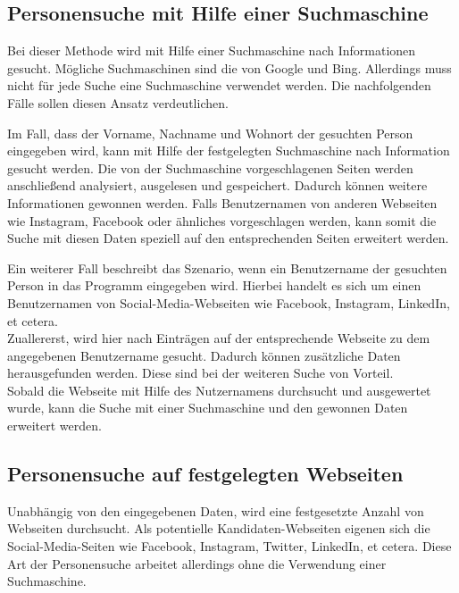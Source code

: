 	\subsection{Personensuche mit Hilfe einer Suchmaschine}
	\label{subsubsec:PersonensucheMitHilfevonSuchmaschine}
	Bei dieser Methode wird mit Hilfe einer Suchmaschine nach Informationen gesucht. Mögliche Suchmaschinen sind die von Google und Bing. Allerdings muss nicht für jede Suche eine Suchmaschine verwendet werden. Die nachfolgenden Fälle sollen diesen Ansatz verdeutlichen.
	
	Im Fall, dass der Vorname, Nachname und Wohnort der gesuchten Person eingegeben wird, kann mit Hilfe der festgelegten Suchmaschine nach Information gesucht werden. Die von der Suchmaschine vorgeschlagenen Seiten werden anschließend analysiert, ausgelesen und gespeichert. Dadurch können weitere Informationen gewonnen werden. Falls Benutzernamen von anderen Webseiten wie Instagram, Facebook oder ähnliches vorgeschlagen werden, kann somit die Suche mit diesen Daten speziell auf den entsprechenden Seiten erweitert werden.
	
	Ein weiterer Fall beschreibt das Szenario, wenn ein Benutzername der gesuchten Person in das Programm eingegeben wird. Hierbei handelt es sich um einen Benutzernamen von Social-Media-Webseiten wie Facebook, Instagram, LinkedIn, et cetera. \\
	Zuallererst, wird hier nach Einträgen auf der entsprechende Webseite zu dem angegebenen Benutzername gesucht. Dadurch können zusätzliche Daten herausgefunden werden. Diese sind bei der weiteren Suche von Vorteil.\\
	Sobald die Webseite mit Hilfe des Nutzernamens durchsucht und ausgewertet wurde, kann die Suche mit einer Suchmaschine und den gewonnen Daten erweitert werden.
	
	\subsection{Personensuche auf festgelegten Webseiten}
	\label{subsubsec:PersonensucheohneSuchmaschine}
	Unabhängig von den eingegebenen Daten, wird eine festgesetzte Anzahl von Webseiten durchsucht. Als potentielle Kandidaten-Webseiten eigenen sich die Social-Media-Seiten wie Facebook, Instagram, Twitter, LinkedIn, et cetera. Diese Art der Personensuche arbeitet allerdings ohne die Verwendung einer Suchmaschine.
	
